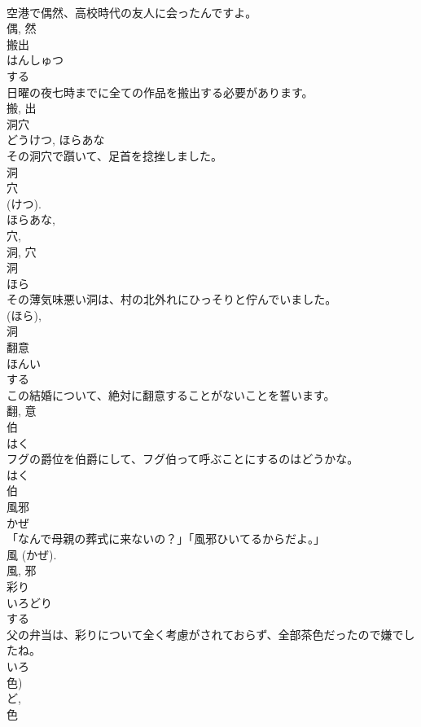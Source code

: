 \documentclass[8pt]{extreport}
\begin{document}
\begin{CJK}{UTF8}{min}
\\	空港で偶然、高校時代の友人に会ったんですよ。	
\\	偶, 然	
\\	搬出	
\\	はんしゅつ	
\\	する 
\\	日曜の夜七時までに全ての作品を搬出する必要があります。	
\\	搬, 出	
\\	洞穴	
\\	どうけつ, ほらあな	
\\	その洞穴で躓いて、足首を捻挫しました。	
\\	洞 
\\	穴 
\\	(けつ). 
\\	ほらあな, 
\\	穴, 
\\	洞, 穴	
\\	洞	
\\	ほら	
\\	その薄気味悪い洞は、村の北外れにひっそりと佇んでいました。	
\\	(ほら), 
\\	洞	
\\	翻意	
\\	ほんい	
\\	する 
\\	この結婚について、絶対に翻意することがないことを誓います。	
\\	翻, 意	
\\	伯	
\\	はく	
\\	フグの爵位を伯爵にして、フグ伯って呼ぶことにするのはどうかな。	
\\	はく 
\\	伯	
\\	風邪	
\\	かぜ	
\\	「なんで母親の葬式に来ないの？」「風邪ひいてるからだよ。」	
\\	風 (かぜ). 
\\	風, 邪	
\\	彩り	
\\	いろどり	
\\	する 
\\	父の弁当は、彩りについて全く考慮がされておらず、全部茶色だったので嫌でしたね。	
\\	いろ 
\\	色) 
\\	ど, 
\\	色 

\end{CJK}
\end{document}
